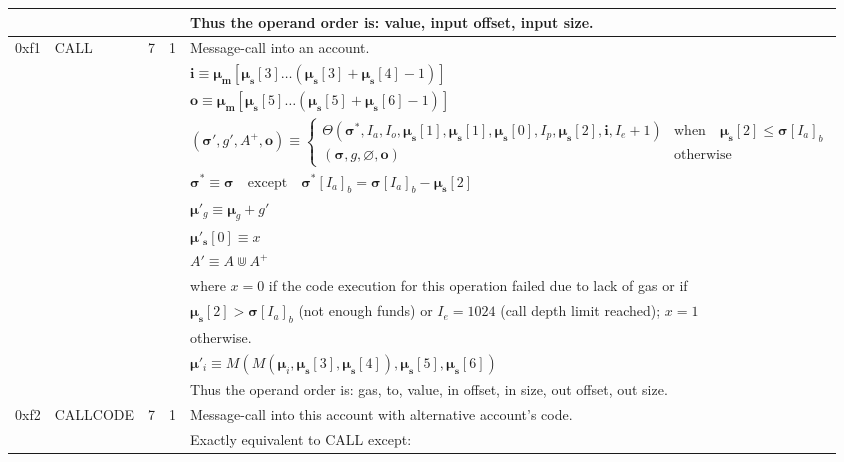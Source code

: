 \documentclass[9pt,oneside]{amsart}
\begin{document}
\begin{tabular*}{\columnwidth}[h]{rlrrl}
&&&& Thus the operand order is: value, input offset, input size. \\
\midrule
0xf1 & {\small CALL} & 7 & 1 & Message-call into an account. \\
&&&& $\mathbf{i} \equiv \boldsymbol{\mu}_\mathbf{m}[ \boldsymbol{\mu}_\mathbf{s}[3] \dots (\boldsymbol{\mu}_\mathbf{s}[3] + \boldsymbol{\mu}_\mathbf{s}[4] - 1) ]$ \\
&&&& $\mathbf{o} \equiv \boldsymbol{\mu}_\mathbf{m}[ \boldsymbol{\mu}_\mathbf{s}[5] \dots (\boldsymbol{\mu}_\mathbf{s}[5] + \boldsymbol{\mu}_\mathbf{s}[6] - 1) ]$ \\
&&&& $(\boldsymbol{\sigma}', g', A^+, \mathbf{o}) \equiv \begin{cases}\Theta(\boldsymbol{\sigma}^*, I_a, I_o, \boldsymbol{\mu}_\mathbf{s}[1], \boldsymbol{\mu}_\mathbf{s}[1], \boldsymbol{\mu}_\mathbf{s}[0], I_p, \boldsymbol{\mu}_\mathbf{s}[2], \mathbf{i}, I_e + 1) & \text{when} \quad \boldsymbol{\mu}_\mathbf{s}[2] \leqslant \boldsymbol{\sigma}[I_a]_b \\ (\boldsymbol{\sigma}, g, \varnothing, \mathbf{o}) & \text{otherwise} \end{cases}$ \\
&&&& $\boldsymbol{\sigma}^* \equiv \boldsymbol{\sigma} \quad \text{except} \quad \boldsymbol{\sigma}^*[I_a]_b = \boldsymbol{\sigma}[I_a]_b - \boldsymbol{\mu}_\mathbf{s}[2]$ \\
&&&& $\boldsymbol{\mu}'_g \equiv \boldsymbol{\mu}_g + g'$ \\
&&&& $\boldsymbol{\mu}'_\mathbf{s}[0] \equiv x$ \\
&&&& $A' \equiv A \Cup A^+$ \\
&&&& where $x=0$ if the code execution for this operation failed due to lack of gas or if  \\
&&&& $\boldsymbol{\mu}_\mathbf{s}[2] > \boldsymbol{\sigma}[I_a]_b$ (not enough funds) or $I_e = 1024$ (call depth limit reached); $x=1$ \\
&&&& otherwise. \\
&&&& $\boldsymbol{\mu}'_i \equiv M(M(\boldsymbol{\mu}_i, \boldsymbol{\mu}_\mathbf{s}[3], \boldsymbol{\mu}_\mathbf{s}[4]), \boldsymbol{\mu}_\mathbf{s}[5], \boldsymbol{\mu}_\mathbf{s}[6])$ \\
&&&& Thus the operand order is: gas, to, value, in offset, in size, out offset, out size. \\
\midrule
0xf2 & {\small CALLCODE} & 7 & 1 & Message-call into this account with alternative account's code. \\
&&&& Exactly equivalent to {\small CALL} except: \\

\end{tabular*}
\end{document}
